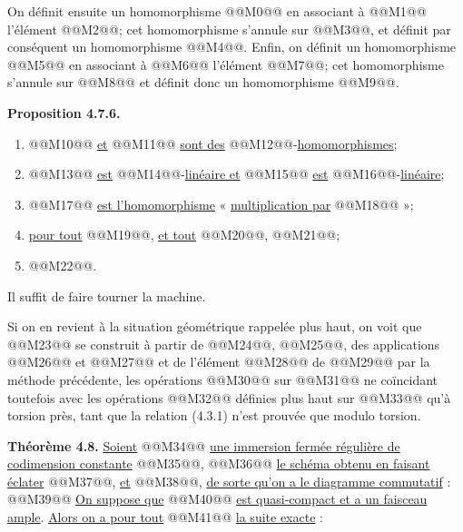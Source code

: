 
On
définit ensuite un homomorphisme @@M0@@ en associant à @@M1@@ l'élément @@M2@@; cet homomorphisme s'annule sur @@M3@@, et définit par conséquent un homomorphisme @@M4@@. Enfin, on définit un homomorphisme @@M5@@ en associant à @@M6@@ l'élément @@M7@@; cet homomorphisme s'annule sur @@M8@@ et définit donc un homomorphisme @@M9@@.

\textbf{Proposition 4.7.6.}
\begin{enumerate}[label=\roman*)]
\item @@M10@@ \uline{et} @@M11@@ \uline{sont des} @@M12@@-\uline{homomorphismes};
\item @@M13@@ \uline{est} @@M14@@-\uline{linéaire et} @@M15@@ \uline{est} @@M16@@-\uline{linéaire};
\item @@M17@@ \uline{est l'homomorphisme} « \uline{multiplication par} @@M18@@ »;
\item \uline{pour tout} @@M19@@, \uline{et tout} @@M20@@, @@M21@@;
\item @@M22@@.
\end{enumerate}

Il suffit de faire tourner la machine.

Si on en revient à la situation géométrique rappelée plus haut, on voit que @@M23@@ se construit à partir de @@M24@@, @@M25@@, des applications @@M26@@ et @@M27@@ et de l'élément @@M28@@ de @@M29@@ par la méthode précédente, les opérations @@M30@@ sur @@M31@@ ne coïncidant toutefois avec les opérations @@M32@@ définies plus haut sur @@M33@@ qu'à torsion près, tant que la relation (4.3.1) n'est prouvée que modulo torsion.

\textbf{Théorème 4.8.} \uline{Soient} @@M34@@ \uline{une immersion fermée régulière de codimension constante} @@M35@@, @@M36@@ \uline{le schéma obtenu en faisant éclater} @@M37@@, \uline{et} @@M38@@, \uline{de sorte qu'on a le diagramme commutatif} :
@@M39@@
\uline{On suppose que} @@M40@@ \uline{est quasi-compact et a un faisceau ample}. \uline{Alors on a pour tout} @@M41@@ \uline{la suite
exacte} :
